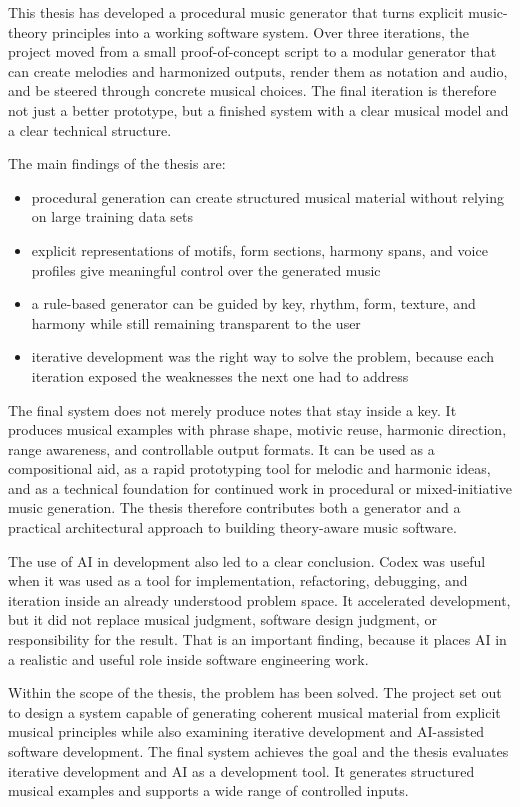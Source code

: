This thesis has developed a procedural music generator that turns explicit music-theory principles into a working software system. Over three iterations, the project moved from a small proof-of-concept script to a modular generator that can create melodies and harmonized outputs, render them as notation and audio, and be steered through concrete musical choices. The final iteration is therefore not just a better prototype, but a finished system with a clear musical model and a clear technical structure.

The main findings of the thesis are:
\begin{itemize}
  \item procedural generation can create structured musical material without relying on large training data sets
  \item explicit representations of motifs, form sections, harmony spans, and voice profiles give meaningful control over the generated music
  \item a rule-based generator can be guided by key, rhythm, form, texture, and harmony while still remaining transparent to the user
  \item iterative development was the right way to solve the problem, because each iteration exposed the weaknesses the next one had to address
\end{itemize}

The final system does not merely produce notes that stay inside a key. It produces musical examples with phrase shape, motivic reuse, harmonic direction, range awareness, and controllable output formats. It can be used as a compositional aid, as a rapid prototyping tool for melodic and harmonic ideas, and as a technical foundation for continued work in procedural or mixed-initiative music generation. The thesis therefore contributes both a generator and a practical architectural approach to building theory-aware music software.

The use of \ac{AI} in development also led to a clear conclusion. Codex was useful when it was used as a tool for implementation, refactoring, debugging, and iteration inside an already understood problem space. It accelerated development, but it did not replace musical judgment, software design judgment, or responsibility for the result. That is an important finding, because it places \ac{AI} in a realistic and useful role inside software engineering work.

Within the scope of the thesis, the problem has been solved. The project set out to design a system capable of generating coherent musical material from explicit musical principles while also examining iterative development and \ac{AI}-assisted software development. The final system achieves the goal and the thesis evaluates iterative development and \ac{AI} as a development tool. It generates structured musical examples and supports a wide range of controlled inputs.
